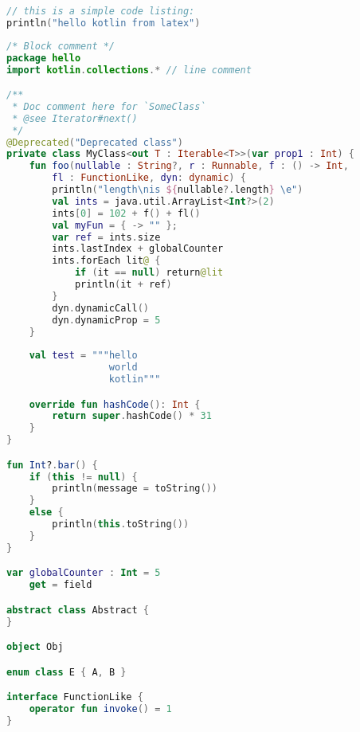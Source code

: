 \documentclass{article}
\begin{document}
\begin{lstlisting}[caption={Simple code listing.}, label={lst:example1}, language=Kotlin]
// this is a simple code listing:
println("hello kotlin from latex")
\end{lstlisting}

\begin{lstlisting}[caption={Example kotlin code.}, label={lst:example1}, language=Kotlin]
/* Block comment */
package hello
import kotlin.collections.* // line comment

/**
 * Doc comment here for `SomeClass`
 * @see Iterator#next()
 */
@Deprecated("Deprecated class")
private class MyClass<out T : Iterable<T>>(var prop1 : Int) {
    fun foo(nullable : String?, r : Runnable, f : () -> Int, 
        fl : FunctionLike, dyn: dynamic) {
        println("length\nis ${nullable?.length} \e")
        val ints = java.util.ArrayList<Int?>(2)
        ints[0] = 102 + f() + fl()
        val myFun = { -> "" };
        var ref = ints.size
        ints.lastIndex + globalCounter
        ints.forEach lit@ {
            if (it == null) return@lit
            println(it + ref)
        }
        dyn.dynamicCall()
        dyn.dynamicProp = 5
    }
    
    val test = """hello
                  world
                  kotlin"""

    override fun hashCode(): Int {
        return super.hashCode() * 31
    }
}

fun Int?.bar() {
    if (this != null) {
        println(message = toString())
    }
    else {
        println(this.toString())
    }
}

var globalCounter : Int = 5
    get = field

abstract class Abstract {
}

object Obj

enum class E { A, B }

interface FunctionLike {
    operator fun invoke() = 1
}
\end{lstlisting}
\end{document}
